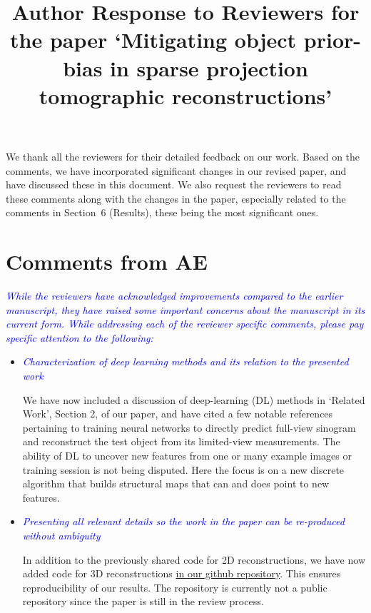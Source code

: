 \documentclass[11pt]{article}
\title{Author Response to Reviewers for the paper `Mitigating object
  prior-bias in sparse projection tomographic reconstructions'}
\begin{document}
\date{}
\maketitle


We thank all the reviewers for their detailed feedback on our
work. Based on the comments, we have incorporated significant changes
in our revised paper, and have discussed these in this document. We
also request the reviewers to read these comments along with the
changes in the paper, especially related to the comments in Section~6
(Results), these being the most significant ones.


\section{Comments from AE}

\textcolor{blue}{\textit{While the reviewers have acknowledged
    improvements compared to the earlier manuscript, they have raised
    some important concerns about the manuscript in its current
    form. While addressing each of the reviewer specific comments,
    please pay specific attention to the following:}} 

  \begin{itemize}
  \item \textcolor{blue}{\textit{Characterization of deep learning
        methods and its relation to the presented work}} 

    We have now included a discussion of deep-learning (DL) methods in
    `Related Work', Section 2, of our paper, and have cited a few
    notable references pertaining to training neural networks to
    directly predict full-view sinogram and reconstruct the test
    object from its limited-view measurements. The ability of DL to
    uncover new features from one or many example images or training
    session is not being disputed. Here the focus is on a new discrete
    algorithm that builds structural maps that can and does point to
    new features.

    \item\textcolor{blue}{\textit{Presenting all relevant details so
          the work in the paper can be re-produced without ambiguity}} 
      

      In addition to the previously shared code for 2D
      reconstructions, we have now added code for 3D reconstructions
      \href{https://github.com/preetigopal/Weighted-Prior-Tomographic-Reconstruction}{in
        our github repository}. This ensures reproducibility of our
      results. The repository is currently not a public repository
      since the paper is still in the review process.

  \end{itemize}
\end{document}
